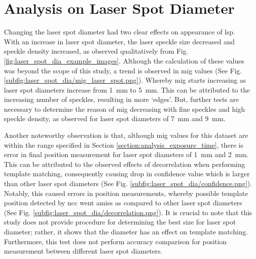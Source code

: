 \section{Analysis on Laser Spot Diameter}
    Changing the laser spot diameter had two clear effects on appearance of \gls{lsp}. With an increase in laser spot diameter, the laser speckle size decreased and speckle density increased, as observed qualitatively from Fig. \ref{fig:laser_spot_dia_example_images}. Although the calculation of these values was beyond the scope of this study, a trend is observed in \gls{mig} values (See Fig. \ref{subfig:laser_spot_dia/mig_laser_spot.png}). Whereby \gls{mig} starts increasing as laser spot diameters increase from \SI{1}{\milli\meter} to \SI{5}{\milli\meter}. This can be attributed to the increasing number of speckles, resulting in more `edges'. But, further tests are necessary to determine the reason of \gls{mig} decreasing with fine speckles and high speckle density, as observed for laser spot diameters of \SI{7}{\milli\meter} and \SI{9}{\milli\meter}.
    
    \vspace{5mm}
    \noindent Another noteworthy observation is that, although \gls{mig} values for this dataset are within the range specified in Section \ref{section:analysis_exposure_time}, there is error in final position measurement for laser spot diameters of \SI{1}{\milli\meter} and \SI{2}{\milli\meter}. This can be attributed to the observed effects of decorrelation when performing template matching, consequently causing drop in confidence value which is larger than other laser spot diameters (See Fig. \ref{subfig:laser_spot_dia/confidence.png}). Notably, this caused errors in position measurements, whereby possible template position detected by \gls{ncc} went amiss as compared to other laser spot diameters (See Fig. \ref{subfig:laser_spot_dia/decorrelation.png}). It is crucial to note that this study does not provide procedure for determining the best size for laser spot diameter; rather, it shows that the diameter has an effect on template matching. Furthermore, this test does not perform accuracy comparison for position measurement between different laser spot diameters.    
    
    


